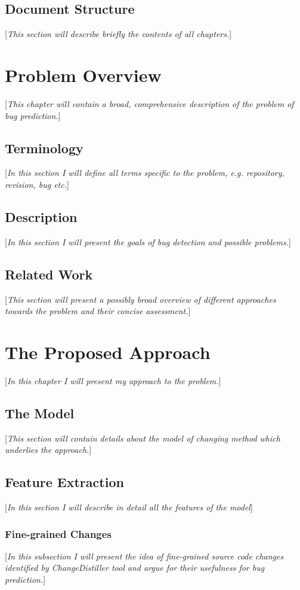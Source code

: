 \documentclass{pracamgr}
\begin{document}
\section{Document Structure}
[\textit{This section will describe briefly the contents of all chapters.}]

\chapter{Problem Overview}
[\textit{This chapter will contain a broad, comprehensive description of the problem of bug prediction.}]

\section{Terminology}
[\textit{In this section I will define all terms specific to the problem, e.g. repository, revision, bug etc.}]

\section{Description}
[\textit{In this section I will present the goals of bug detection and possible problems.}]

\section{Related Work}
[\textit{This section will present a possibly broad overview of different approaches towards the problem and their concise assessment.}]

\chapter{The Proposed Approach}
[\textit{In this chapter I will present my approach to the problem.}]

\section{The Model}
[\textit{This section will contain details about the model of changing method which underlies the approach.}]

\section{Feature Extraction}
[\textit{In this section I will describe in detail all the features of the model}]

\subsection{Fine-grained Changes}
[\textit{In this subsection I will present the idea of fine-grained source code changes identified by ChangeDistiller tool and argue for their usefulness for bug prediction.}]
\end{document}
